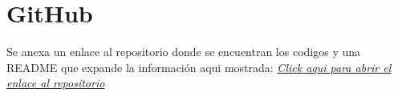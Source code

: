 \appendix
\chapter{GitHub}
Se anexa un enlace al repositorio donde se encuentran los codigos y una README que expande la información aqui mostrada: \href{https://github.com/CARBAJE/Practica01-TSAB}{\textit{Click aqui para abrir el enlace al repositorio}}
%
%